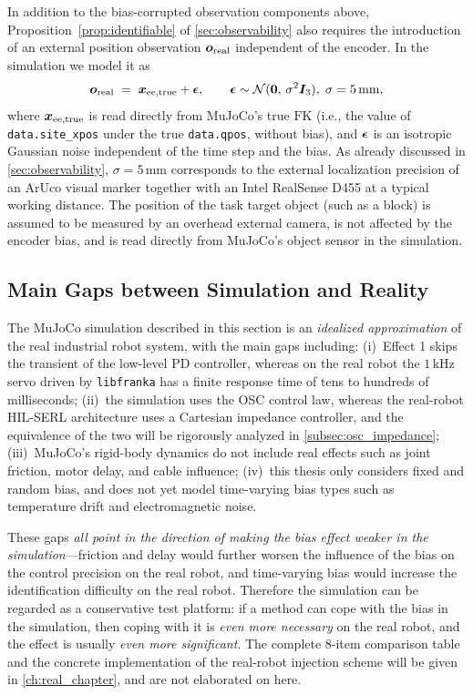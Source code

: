 In addition to the bias-corrupted observation components above, Proposition~\ref{prop:identifiable} of \cref{sec:observability} also requires the introduction of an external position observation $\bm{o}_{\text{real}}$ independent of the encoder. In the simulation we model it as
\begin{equation}
  \bm{o}_{\text{real}} \;=\; \bm{x}_{\text{ee,true}} + \bm{\epsilon},
  \qquad \bm{\epsilon} \sim \mathcal{N}(\bm{0},\,\sigma^2 \bm{I}_3),\; \sigma = 5\,\text{mm},
  \label{eq:sim_real_tcp}
\end{equation}
where $\bm{x}_{\text{ee,true}}$ is read directly from MuJoCo's true $\text{FK}$ (i.e., the value of \texttt{data.site\_xpos} under the true \texttt{data.qpos}, without bias), and $\bm{\epsilon}$ is an isotropic Gaussian noise independent of the time step and the bias. As already discussed in \cref{sec:observability}, $\sigma = 5$\,mm corresponds to the external localization precision of an ArUco visual marker together with an Intel RealSense D455 at a typical working distance. The position of the task target object (such as a block) is assumed to be measured by an overhead external camera, is not affected by the encoder bias, and is read directly from MuJoCo's object sensor in the simulation.

\subsection{Main Gaps between Simulation and Reality}\label{subsec:sim_real_gap}

The MuJoCo simulation described in this section is an \emph{idealized approximation} of the real industrial robot system, with the main gaps including: (i)~Effect 1 skips the transient of the low-level PD controller, whereas on the real robot the $1$\,kHz servo driven by \texttt{libfranka} has a finite response time of tens to hundreds of milliseconds; (ii)~the simulation uses the OSC control law, whereas the real-robot HIL-SERL architecture uses a Cartesian impedance controller, and the equivalence of the two will be rigorously analyzed in \cref{subsec:osc_impedance}; (iii)~MuJoCo's rigid-body dynamics do not include real effects such as joint friction, motor delay, and cable influence; (iv)~this thesis only considers fixed and random bias, and does not yet model time-varying bias types such as temperature drift and electromagnetic noise.

These gaps \emph{all point in the direction of making the bias effect weaker in the simulation}---friction and delay would further worsen the influence of the bias on the control precision on the real robot, and time-varying bias would increase the identification difficulty on the real robot. Therefore the simulation can be regarded as a conservative test platform: if a method can cope with the bias in the simulation, then coping with it is \emph{even more necessary} on the real robot, and the effect is usually \emph{even more significant}. The complete 8-item comparison table and the concrete implementation of the real-robot injection scheme will be given in \cref{ch:real_chapter}, and are not elaborated on here.
